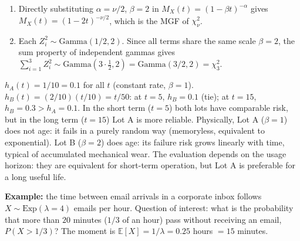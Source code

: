 \begin{solproblema}[prob:6b498ea]
	\begin{enumerate}
		\item Directly substituting $\alpha=\nu/2$, $\beta=2$ in $M_X(t)=(1-\beta t)^{-\alpha}$ gives $M_X(t) = (1-2t)^{-\nu/2}$, which is the MGF of $\chi^2_\nu$.
		\item Each $Z_i^2 \sim \text{Gamma}(1/2,2)$. Since all terms share the same scale $\beta=2$, the sum property of independent gammas gives $\sum_{i=1}^3 Z_i^2 \sim \text{Gamma}(3\cdot\tfrac{1}{2},2) = \text{Gamma}(3/2,2) = \chi^2_3$.
	\end{enumerate}
\end{solproblema}

\begin{solproblema}[prob:0f44096]
	$h_A(t) = 1/10 = 0.1$ for all $t$ (constant rate, $\beta=1$). $h_B(t) = (2/10)(t/10) = t/50$: at $t=5$, $h_B=0.1$ (tie); at $t=15$, $h_B=0.3 > h_A=0.1$. In the short term ($t=5$) both lots have comparable risk, but in the long term ($t=15$) Lot A is more reliable. Physically, Lot A ($\beta=1$) does not age: it fails in a purely random way (memoryless, equivalent to exponential). Lot B ($\beta=2$) does age: its failure risk grows linearly with time, typical of accumulated mechanical wear. The evaluation depends on the usage horizon: they are equivalent for short-term operation, but Lot A is preferable for a long useful life.
\end{solproblema}

\begin{solproblema}[prob:31a003b]
	\textbf{Example:} the time between email arrivals in a corporate inbox follows $X \sim \text{Exp}(\lambda=4)$ emails per hour. Question of interest: what is the probability that more than $20$ minutes ($1/3$ of an hour) pass without receiving an email, $P(X > 1/3)$? The moment is $\mathbb{E}[X] = 1/\lambda = 0.25$ hours $= 15$ minutes.
\end{solproblema}
